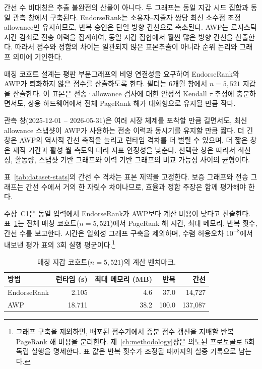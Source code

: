 간선 수 비대칭은 추출 불완전의 산물이 아니다. 두 그래프는 동일 지갑 시드 집합과 동일 관측 창에서 구축된다. EndorseRank는 소유자--지출자 쌍당 최신 소수점 조정 allowance만 유지하므로, 반복 승인은 단일 방향 간선으로 축소된다. AWP는 로지스틱 시간 감쇠로 전송 이력을 집계하여, 동일 지갑 집합에서 훨씬 많은 방향 간선을 산출한다. 따라서 점수와 정합의 차이는 일관되지 않은 표본추출이 아니라 순위 논리와 그래프 의미에 기인한다.

매칭 코호트 설계는 평판 부분그래프의 비영 연결성을 요구하여 EndorseRank와 AWP가 퇴화하지 않은 점수를 산출하도록 한다. 필터는 6개월 창에서 $n=5{,}521$ 지갑을 산출한다. 이 표본은 전송·allowance 검사에 대한 안정적 Kendall $\tau$ 추정에 충분하면서도, 상용 하드웨어에서 전체 PageRank 해가 대화형으로 유지될 만큼 작다.

관측 창(2025-12-01 -- 2026-05-31)은 여러 시장 체제를 포착할 만큼 길면서도, 최신 allowance 스냅샷이 AWP가 사용하는 전송 이력과 동시기를 유지할 만큼 짧다. 더 긴 창은 AWP의 역사적 간선 축적을 늘리고 런타임 격차를 더 벌릴 수 있으며, 더 짧은 창은 재직 기간과 활성 월 측도의 대리 지표 안정성을 낮춘다. 선택한 창은 따라서 최신성, 활동량, 스냅샷 기반 그래프와 이력 기반 그래프의 비교 가능성 사이의 균형이다.

표~\ref{tab:dataset-stats}의 간선 수 격차는 표본 제약을 고정한다. 보증 그래프와 전송 그래프는 간선 수에서 거의 한 자릿수 차이나므로, 효율과 정합 주장은 함께 평가해야 한다.


주장~C1은 동일 입력에서 EndorseRank가 AWP보다 계산 비용이 낮다고 진술한다. 표~\ref{tab:benchmark-runtime}는 전체 매칭 코호트($n=5{,}521$)에서 PageRank 해 시간, 최대 메모리, 반복 횟수, 간선 수를 보고한다. 시간은 일회성 그래프 구축을 제외하며, 수렴 허용오차 $10^{-8}$에서 내보낸 평가 표의 3회 실행 평균이다.\footnote{그래프 구축을 제외하면, 배포된 점수기에서 증분 점수 갱신을 지배할 반복 PageRank 해 비용을 분리한다. 제~\ref{ch:methodology}장은 의도된 프로토콜로 5회 독립 실행을 명세한다. 표 값은 반복 횟수가 조정될 때까지의 실증 기록으로 남는다.}

\begin{table}[htbp]
\centering
\caption{매칭 지갑 코호트($n=5{,}521$)의 계산 벤치마크.}
\label{tab:benchmark-runtime}
\begin{tabular}{lrrrr}
\toprule
방법 & 런타임 (s) & 최대 메모리 (MB) & 반복 & 간선 \\
\midrule
EndorseRank & 2.105 & 4.6 & 37.0 & 14{,}727 \\
AWP & 18.711 & 38.2 & 100.0 & 137{,}087 \\
\bottomrule
\end{tabular}
\end{table}

